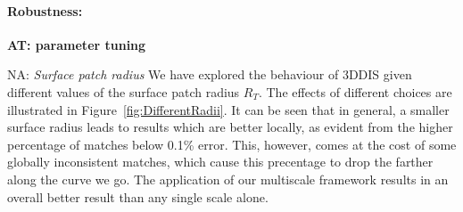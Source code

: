 \documentclass[10pt,twocolumn,letterpaper]{article}
\newcommand{\colornote}[3]{{\color{#1}\bf{#2: #3}\normalfont}}
\newcommand{\colornote}[3]{}
\newcommand {\ayellet}[1]{\colornote{blue}{AT}{#1}}
\newcommand {\nadav}[1]{\colornote{red}{NA}{#1}}
\begin{document}
\paragraph{Robustness:} 
\ayellet{parameter tuning}
\nadav{
\textit{Surface patch radius} We have explored the behaviour of 3DDIS given different values of the surface patch radius $R_T$. 
The effects of different choices are illustrated in Figure~\ref{fig:DifferentRadii}.
It can be seen that in general, a smaller surface radius leads to results which are better locally, as evident from the higher percentage of matches below 0.1\% error. 
This, however, comes at the cost of some globally inconsistent matches, which cause this precentage to drop the farther along the curve we go.
The application of our multiscale framework results in an overall better result than any single scale alone.
\begin{figure}[htb]


\end{figure}}
\end{document}

